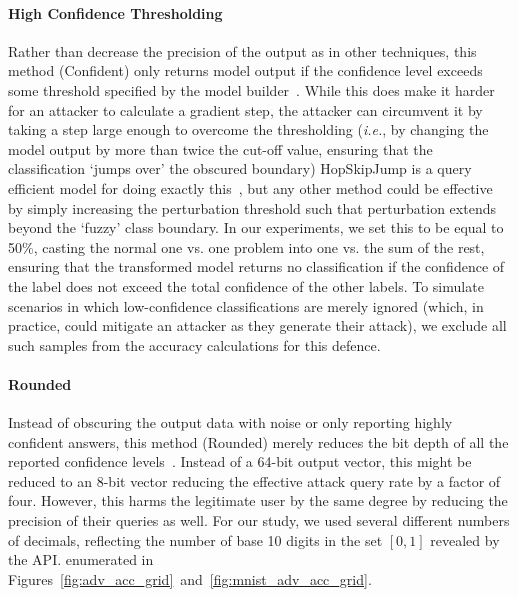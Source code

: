 \documentclass[journal]{IEEEtran}
\newcommand{\ie}{\textit{i.e.}\xspace}
\begin{document}
\paragraph{High Confidence Thresholding}
Rather than decrease the precision of the output as in other techniques, this method (Confident) only returns model output if the confidence level exceeds some threshold specified by the model builder~\cite{high_conf}. While this does make it harder for an attacker to calculate a gradient step, the attacker can circumvent it by taking a step large enough to overcome the thresholding (\ie, by changing the model output by more than twice the cut-off value, ensuring that the classification `jumps over' the obscured boundary) HopSkipJump is a query efficient model for doing exactly this~\cite{hopskipjump}, but any other method could be effective by simply increasing the perturbation threshold such that perturbation extends beyond the `fuzzy' class boundary. In our experiments, we set this to be equal to 50\%, casting the normal one vs. one problem into one vs. the sum of the rest, ensuring that the transformed model returns no classification if the confidence of the label does not exceed the total confidence of the other labels. To simulate scenarios in which low-confidence classifications are merely ignored (which, in practice, could mitigate an attacker as they generate their attack), we exclude all such samples from the accuracy calculations for this defence. 

\paragraph{Rounded}
Instead of obscuring the output data with noise or only reporting highly confident answers, this method (Rounded) merely reduces the bit depth of all the reported confidence levels~\cite{discretization}. Instead of a 64-bit output vector, this might be reduced to an 8-bit vector reducing the effective attack query rate by a factor of four. However, this harms the legitimate user by the same degree by reducing the precision of their queries as well. For our study, we used several different numbers of decimals, reflecting the number of base 10 digits in the set $[0,1]$ revealed by the API. enumerated in Figures~\ref{fig:adv_acc_grid}~and~\ref{fig:mnist_adv_acc_grid}. 
\end{document}
